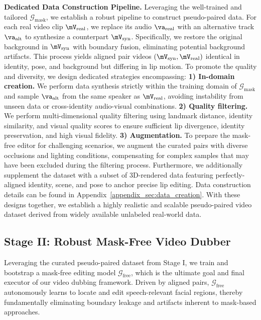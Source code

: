 \documentclass{article}
\newcommand{\myparagraph}[1]{\noindent\textbf{#1}}
\theoremstyle{plain}
\theoremstyle{definition}
\theoremstyle{remark}
\begin{document}
\myparagraph{Dedicated Data Construction Pipeline.}
Leveraging the well-trained and tailored $\mathcal{G}_{\text{mask}}$, we establish a robust pipeline to construct pseudo-paired data.
For each real video clip $\mV_{\text{real}}$, we replace its audio $\va_{\text{real}}$ with an alternative track $\va_{\text{alt}}$ to synthesize a counterpart $\mV_{\text{syn}}$.
Specifically, we restore the original background in $\mV_{\text{syn}}$ with boundary fusion, eliminating potential background artifacts.
This process yields aligned pair videos $(\mV_{\text{syn}}, \mV_{\text{real}})$ identical in identity, pose, and background but differing in lip motion.
To promote the quality and diversity, we design dedicated strategies encompassing:
\textbf{1) In-domain creation.} We perform data synthesis strictly within the training domain of $\mathcal{G}_{\text{mask}}$ and sample $\va_{\text{alt}}$ from the same speaker as $\mV_{\text{real}}$, avoiding instability from unseen data or cross-identity audio-visual combinations. 
\textbf{2) Quality filtering.} We perform multi-dimensional quality filtering using landmark distance, identity similarity, and visual quality scores to ensure sufficient lip divergence, identity preservation, and high visual fidelity.
\textbf{3) Augmentation.} To prepare the mask-free editor for challenging scenarios, we augment the curated pairs with diverse occlusions and lighting conditions, compensating for complex samples that may have been excluded during the filtering process.
Furthermore, we additionally supplement the dataset with a subset of 3D-rendered data featuring perfectly-aligned identity, scene, and pose to anchor precise lip editing.
Data construction details can be found in Appendix~\ref{appendix_sec:data_creation}.
With these designs together, we establish a highly realistic and scalable pseudo-paired video dataset derived from widely available unlabeled real-world data.

\subsection{Stage II: Robust Mask-Free Video Dubber}
\label{sec:stage2}

Leveraging the curated pseudo-paired dataset from Stage I, we train and bootstrap a mask-free editing model $\mathcal{G}_{\text{free}}$, which is the ultimate goal and final executor of our video dubbing framework.
Driven by aligned pairs, $\mathcal{G}_{\text{free}}$ autonomously learns to locate and edit speech-relevant facial regions, thereby fundamentally eliminating boundary leakage and artifacts inherent to mask-based approaches.
\end{document}
